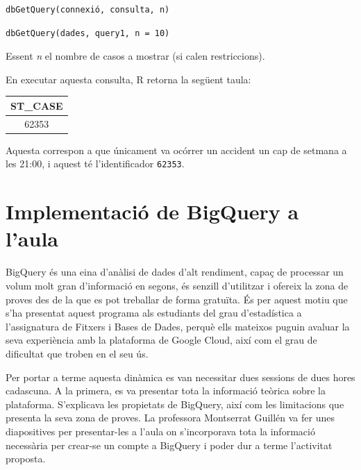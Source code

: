\documentclass[11pt,longbibliography]{article}
\theoremstyle{definition}
\theoremstyle{remark}
\begin{document}
\begin{multicols}{2}

\begin{verbatim}
dbGetQuery(connexió, consulta, n)
\end{verbatim}

\columnbreak

\begin{verbatim}
dbGetQuery(dades, query1, n = 10)
\end{verbatim}

\end{multicols}

Essent \emph{n} el nombre de casos a mostrar (si calen restriccions).


En executar aquesta consulta, R retorna la següent taula:

\begin{table}[h]
\centering
\begin{tabular}{|c|}
\hline
\textbf{ST\_CASE} \\ \hline
62353             \\ \hline
\end{tabular}
\end{table}

Aquesta correspon a que únicament va ocórrer un accident un cap de setmana a les 21:00, i aquest té l'identificador \texttt{62353}.

\newpage

\section{Implementació de BigQuery a l'aula}

BigQuery és una eina d'anàlisi de dades d'alt rendiment, capaç de processar un volum molt gran d'informació en segons, és senzill d'utilitzar i ofereix la zona de proves des de la que es pot treballar de forma gratuïta. És per aquest motiu que s'ha presentat aquest programa als estudiants del grau d'estadística a l'assignatura de Fitxers i Bases de Dades, perquè ells mateixos puguin avaluar la seva experiència amb la plataforma de Google Cloud, així com el grau de dificultat que troben en el seu ús.

Per portar a terme aquesta dinàmica es van necessitar dues sessions de dues hores cadascuna. A la primera, es va presentar tota la informació teòrica sobre la plataforma. S'explicava les propietats de BigQuery, així com les limitacions que presenta la seva zona de proves. La professora Montserrat Guillén va fer unes diapositives per presentar-les a l'aula on s'incorporava tota la informació necessària per crear-se un compte a BigQuery i poder dur a terme l'activitat proposta.
\end{document}
